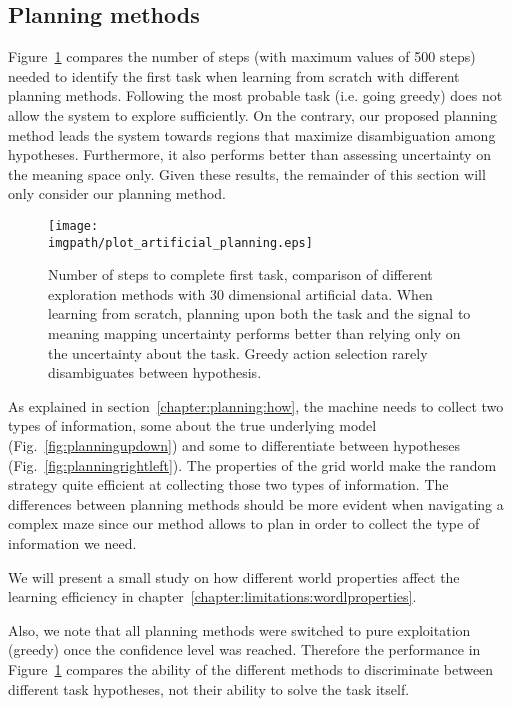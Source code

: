 \subsection{Planning methods}

Figure~\ref{fig:artificialplanning} compares the number of steps (with maximum values of 500 steps) needed to identify the first task when learning from scratch with different planning methods. Following the most probable task (i.e. going greedy) does not allow the system to explore sufficiently. On the contrary, our proposed planning method leads the system towards regions that maximize disambiguation among hypotheses. Furthermore, it also performs better than assessing uncertainty on the meaning space only. Given these results, the remainder of this section will only consider our planning method.

\begin{figure}[!htbp]
  \centering
      \texttt{[image: \\imgpath/plot\_artificial\_planning.eps]}
      \caption{Number of steps to complete first task, comparison of different exploration methods with 30 dimensional artificial data. When learning from scratch, planning upon both the task and the signal to meaning mapping uncertainty performs better than relying only on the uncertainty about the task. Greedy action selection rarely disambiguates between hypothesis.}
    \label{fig:artificialplanning}
\end{figure}

As explained in section~\ref{chapter:planning:how}, the machine needs to collect two types of information, some about the true underlying model (Fig.~\ref{fig:planningupdown}) and some to differentiate between hypotheses (Fig.~\ref{fig:planningrightleft}). The properties of the grid world make the random strategy quite efficient at collecting those two types of information. The differences between planning methods should be more evident when navigating a complex maze since our method allows to plan in order to collect the type of information we need. 

We will present a small study on how different world properties affect the learning efficiency in chapter~\ref{chapter:limitations:wordlproperties}. 

Also, we note that all planning methods were switched to pure exploitation (greedy) once the confidence level was reached. Therefore the performance in Figure~\ref{fig:artificialplanning} compares the ability of the different methods to discriminate between different task hypotheses, not their ability to solve the task itself.

